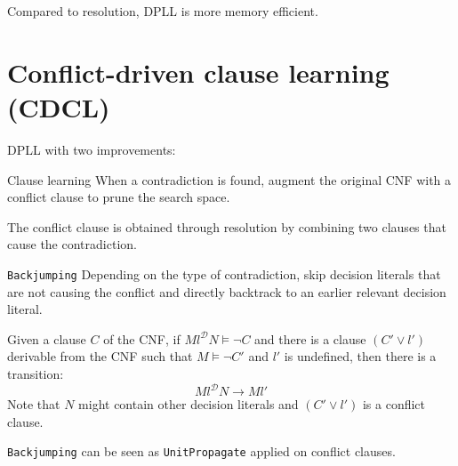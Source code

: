 \begin{remark}
    Compared to resolution, DPLL is more memory efficient.
\end{remark}



\section{Conflict-driven clause learning (CDCL)}

DPLL with two improvements:
\begin{descriptionlist}
    \item[Clause learning] 
        When a contradiction is found, augment the original CNF with a conflict clause
        to prune the search space.

        The conflict clause is obtained through resolution by combining two clauses that cause the contradiction.

    \item[\texttt{Backjumping}]
        Depending on the type of contradiction, skip decision literals that are not causing the conflict
        and directly backtrack to an earlier relevant decision literal.

        Given a clause $C$ of the CNF, if $Ml^\mathcal{D}N \models \lnot C$ and 
        there is a clause $(C' \vee l')$ derivable from the CNF such that $M \models \lnot C'$ and
        $l'$ is undefined, then there is a transition:
        \[ Ml^\mathcal{D}N \rightarrow Ml' \] 
        Note that $N$ might contain other decision literals and $(C' \vee l')$ is a conflict clause.

        \begin{remark}
            \texttt{Backjumping} can be seen as \texttt{UnitPropagate} applied on conflict clauses.
        \end{remark}
\end{descriptionlist}

